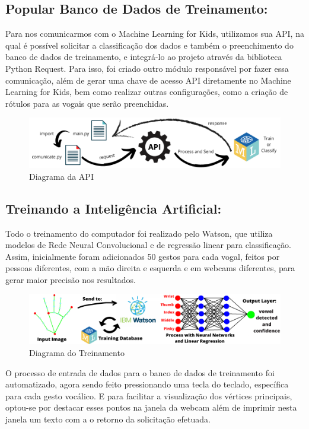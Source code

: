 \documentclass[a4paper, 12pt]{article}
\begin{document}
\subsection{Popular Banco de Dados de Treinamento:}

Para nos comunicarmos com o Machine Learning for Kids, utilizamos sua API, na qual é possível solicitar a classificação dos dados e também o preenchimento do banco de dados de treinamento, e integrá-lo ao projeto através da biblioteca Python Request\cite{requests}. Para isso, foi criado outro módulo responsável por fazer essa comunicação, além de gerar uma chave de acesso API diretamente no Machine Learning for Kids, bem como realizar outras configurações, como a criação de rótulos para as vogais que serão preenchidas.

 \begin{figure}[!ht]
\centering
\includegraphics[scale=0.5]{img/api_diagram.png}
\caption{Diagrama da API}
\label{figure_6}
\end{figure}


\subsection{Treinando a Inteligência Artificial:}
Todo o treinamento do computador foi realizado pelo Watson, que utiliza modelos de Rede Neural Convolucional e de regressão linear para classificação. Assim, inicialmente foram adicionados 50 gestos para cada vogal, feitos por pessoas diferentes, com a mão direita e esquerda e em webcams diferentes, para gerar maior precisão nos resultados.

 \begin{figure}[!ht]
\centering
\includegraphics[scale=0.5]{img/training_diagram.png}
\caption{Diagrama do Treinamento}
\label{figure_7}
\end{figure}

O processo de entrada de dados para o banco de dados de treinamento foi automatizado, agora sendo feito pressionando uma tecla do teclado, específica para cada gesto vocálico. E para facilitar a visualização dos vértices principais, optou-se por destacar esses pontos na janela da webcam além de imprimir nesta janela um texto com a o retorno da solicitação efetuada.
\end{document}
